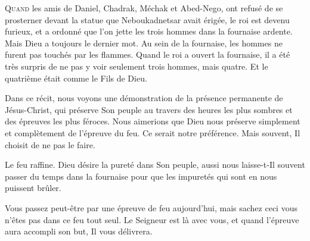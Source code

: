 \dvrule







\lettrine{Q}{uand} les amis de Daniel, Chadrak, Méchak et Abed-Nego,
 ont refusé de se prosterner devant la statue que Neboukadnetsar avait érigée,
 le roi est devenu furieux, et a ordonné que l'on jette les trois hommes
 dans la fournaise ardente. Mais Dieu a toujours le dernier mot.
 Au sein de la fournaise, les hommes ne furent pas touchés par les flammes.
 Quand le roi a ouvert la fournaise, il a été très surpris de ne pas y voir
 seulement trois hommes, mais quatre.
 Et le quatrième était comme \Og le Fils de Dieu. \Fg{}

Dans ce récit, nous voyons une démonstration de la présence permanente
 de Jésus-Christ, qui préserve Son peuple au travers des heures
 les plus sombres et des  épreuves les plus féroces.
 Nous aimerions que Dieu nous préserve simplement et complètement
 de l'épreuve du feu. Ce serait notre préférence.
 Mais souvent, Il choisit de ne pas le faire. 


Le feu raffine. Dieu désire la pureté dans Son peuple,
 aussi nous laisse-t-Il souvent passer du temps dans la fournaise
 pour que les impuretés qui sont en nous puissent brûler. 

Vous passez peut-être par une épreuve de feu aujourd'hui, mais sachez ceci
 \ocadr vous n'êtes pas dans ce feu tout seul.
 Le Seigneur est là avec vous, et quand l'épreuve aura accompli son but,
 Il vous délivrera. 

\dvrule




